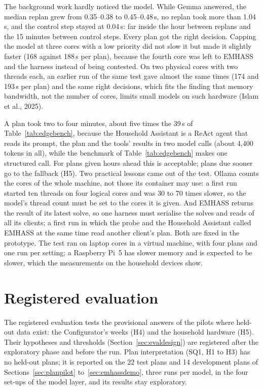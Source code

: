 \documentclass[12pt,a4paper]{report}
\begin{document}
The background work hardly noticed the model. While Gemma answered, the
median replan grew from 0.35--0.38 to 0.45--0.48\,s, no replan took
more than 1.04\,s, and the control step stayed at 0.04\,s: far inside
the hour between replans and the 15 minutes between control steps.
Every plan got the right decision. Capping the model at three cores
with a low priority did not slow it but made it slightly faster (168
against 188\,s per plan), because the fourth core was left to EMHASS
and the harness instead of being contested. On two physical cores with
two threads each, an earlier run of the same test gave almost the same
times (174 and 193\,s per plan) and the same right decisions, which fits
the finding that memory bandwidth, not the number of cores, limits small
models on such hardware (Islam et al., 2025).

A plan took two to four minutes, about five times the 39\,s of
Table~\ref{tab:edgebench}, because the Household Assistant is a ReAct
agent that reads its prompt, the plan and the tools' results in two
model calls (about 4,400 tokens in all), while the benchmark of
Table~\ref{tab:edgebench} makes one structured call. For plans given
hours ahead this is acceptable; plans due sooner go to the fallback
(H5). Two practical lessons came out of the test. Ollama counts the
cores of the whole machine, not those its container may use: a first
run started ten threads on four logical cores and was 30 to 70 times
slower, so the model's thread count must be set to the cores it is
given. And EMHASS returns the result of its latest solve, so one
harness must serialise the solves and reads of all its clients; a first
run in which the probe and the Household Assistant called EMHASS at the
same time read another client's plan. Both are fixed in the prototype.
The test ran on laptop cores in a virtual machine, with four plans and
one run per setting; a Raspberry Pi~5 has slower memory and is
expected to be slower, which the measurements on the household devices
show.

\section{Registered evaluation}
\label{sec:registered}

The registered evaluation tests the provisional answers of the pilots
where held-out data exist: the Configurator's weeks (H4) and the
household hardware (H5). Their hypotheses and thresholds
(Section~\ref{sec:evaldesign}) are registered after the exploratory
phase and before the run. Plan interpretation (SQ1, H1 to H3) has no
held-out plans; it is reported on the 22 test plans and 14 development
plans of Sections~\ref{sec:planpilot} to~\ref{sec:emhassdemo}, three
runs per model, in the four set-ups of the model layer, and its results
stay exploratory.
\end{document}
